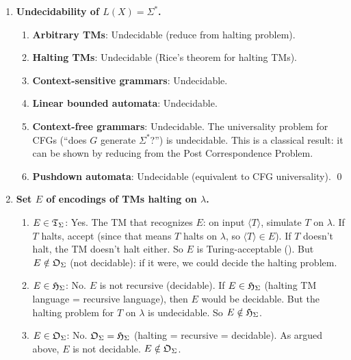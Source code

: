 \begin{enumerate}[{12.}1. ]
\begin{enumerate}
\item \textbf{Linear bounded automata}: Undecidable. The emptiness problem for LBAs is undecidable (since CSG = LBL and CSG emptiness is undecidable). \qed
\end{enumerate}

\item \textbf{Undecidability of $L(X)=\Sigma^*$.}

\begin{enumerate}
\item \textbf{Arbitrary TMs}: Undecidable (reduce from halting problem).
\item \textbf{Halting TMs}: Undecidable (Rice's theorem for halting TMs).
\item \textbf{Context-sensitive grammars}: Undecidable.
\item \textbf{Linear bounded automata}: Undecidable.
\item \textbf{Context-free grammars}: Undecidable. The universality problem for CFGs (``does $G$ generate $\Sigma^*$?'') is undecidable. This is a classical result: it can be shown by reducing from the Post Correspondence Problem.
\item \textbf{Pushdown automata}: Undecidable (equivalent to CFG universality). \qed
\end{enumerate}

\item \textbf{Set $E$ of encodings of TMs halting on $\lambda$.}

\begin{enumerate}
\item \textbf{$E\in\mathfrak{T}_\Sigma$}: Yes. The TM that recognizes $E$: on input $\langle T\rangle$, simulate $T$ on $\lambda$. If $T$ halts, accept (since that means $T$ halts on $\lambda$, so $\langle T\rangle\in E$). If $T$ doesn't halt, the TM doesn't halt either. So $E$ is Turing-acceptable (\TSIG). But $E\notin\mathfrak{O}_\Sigma$ (not decidable): if it were, we could decide the halting problem.

\item \textbf{$E\in\mathfrak{H}_\Sigma$}: No. $E$ is not recursive (decidable). If $E\in\mathfrak{H}_\Sigma$ (halting TM language = recursive language), then $E$ would be decidable. But the halting problem for $T$ on $\lambda$ is undecidable. So $E\notin\mathfrak{H}_\Sigma$.

\item \textbf{$E\in\mathfrak{O}_\Sigma$}: No. $\mathfrak{O}_\Sigma = \mathfrak{H}_\Sigma$ (halting = recursive = decidable). As argued above, $E$ is not decidable. $E\notin\mathfrak{O}_\Sigma$.
\end{enumerate}


\end{enumerate}
